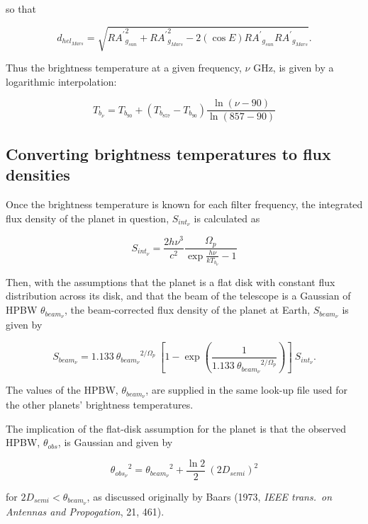 \documentclass[11pt,twoside]{starlink}
\begin{document}
so that

\begin{displaymath}
d_{hel_{Mars}} = \sqrt{{RA^\prime}_{g_{sun}}^2 + {RA^\prime}_{g_{Mars}}^2 - 2 (\cos E){RA^\prime}_{g_{sun}}{RA^\prime}_{g_{Mars}}}.
\end{displaymath}

Thus the brightness temperature at a given frequency, $\nu$ GHz, is given by a logarithmic interpolation:

\begin{displaymath}
T_{b_\nu} = T_{b_{90}} + (T_{b_{857}} - T_{b_{90}})\frac{\ln(\nu - 90)}{\ln(857 -90)}
\end{displaymath}

\subsection{Converting brightness temperatures to flux densities}
\label{sec:fluxdensities}

Once the brightness temperature is known for each filter frequency, the integrated flux density of the planet in question, $S_{int_\nu}$ is calculated as

\begin{displaymath}
S_{int_\nu} = \frac{2 h \nu^3}{c^2}\frac{ \Omega_p}{\exp{\frac{h \nu}{k T_{b_\nu}}} - 1}
\end{displaymath}

Then, with the assumptions that the planet is a flat disk with constant flux distribution across its disk, and that the beam of the telescope is a Gaussian of HPBW $\theta_{beam_\nu}$, the beam-corrected flux density of the planet at Earth, $S_{beam_\nu}$ is given by

\begin{displaymath}
S_{beam_\nu} = 1.133\ {\theta_{beam_\nu}}^{2/\Omega_p}\ [1 - \exp({\frac{1}{1.133\ {\theta_{beam_\nu}}^{2/\Omega_p} }})]\ S_{int_\nu}.
\end{displaymath}

The values of the HPBW, $\theta_{beam_\nu}$, are supplied in the same look-up file used for the other planets' brightness temperatures.

The implication of the flat-disk assumption for the planet is that the observed HPBW, $\theta_{obs}$, is Gaussian and given by

\begin{displaymath}
{\theta_{obs_\nu}}^2 = {\theta_{beam_\nu}}^2 + \frac{\ln 2}{2}\ {(2 D_{semi})}^2
\end{displaymath}

for $2 D_{semi} < \theta_{beam_\nu}$, as discussed originally by Baars (1973, \emph{IEEE trans.\ on Antennas and Propogation}, 21, 461).
\end{document}
